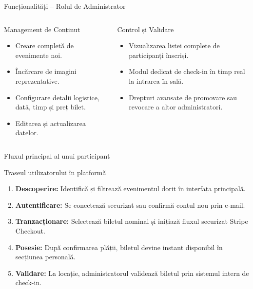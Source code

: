 \documentclass[aspectratio=169,12pt]{beamer}
\begin{document}
	\begin{frame}{Funcționalități -- Rolul de Administrator}
		\begin{columns}[T]
			\begin{block}{Management de Conținut}
				\begin{itemize}
					\item Creare completă de evenimente noi.
					\item Încărcare de imagini reprezentative.
					\item Configurare detalii logistice, dată, timp și preț bilet.
					\item Editarea și actualizarea datelor.
				\end{itemize}
			\end{block}
			\begin{block}{Control și Validare}
				\begin{itemize}
					\item Vizualizarea listei complete de participanți înscriși.
					\item Modul dedicat de check-in în timp real la intrarea în sală.
					\item Drepturi avansate de promovare sau revocare a altor administratori.
				\end{itemize}
			\end{block}
		\end{columns}
	\end{frame}
	
	\begin{frame}{Fluxul principal al unui participant}
		\begin{block}{Traseul utilizatorului în platformă}
			\begin{enumerate}
				\item \textbf{Descoperire:} Identifică și filtrează evenimentul dorit în interfața principală.
				\item \textbf{Autentificare:} Se conectează securizat sau confirmă contul nou prin e-mail.
				\item \textbf{Tranzacționare:} Selectează biletul nominal și inițiază fluxul securizat Stripe Checkout.
				\item \textbf{Posesie:} După confirmarea plății, biletul devine instant disponibil în secțiunea personală.
				\item \textbf{Validare:} La locație, administratorul validează biletul prin sistemul intern de check-in.
			\end{enumerate}
		\end{block}
	\end{frame}
	
\end{document}

